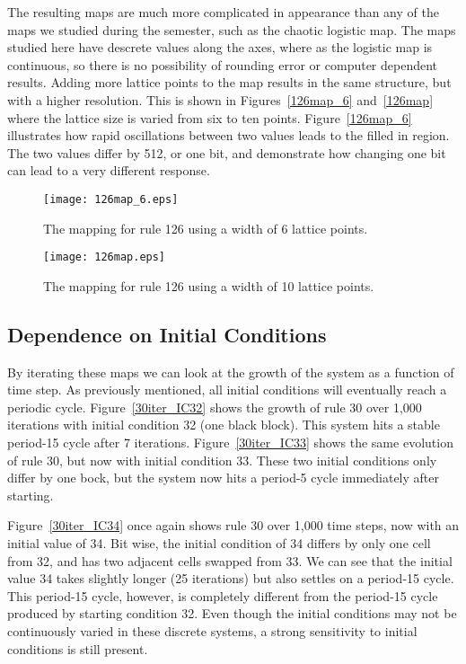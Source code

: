 The resulting maps are much more complicated in appearance than any of the maps we studied during the semester, such as the chaotic logistic map.  
The maps studied here have descrete values along the axes, where as the logistic map is continuous, so there is no possibility of rounding error or computer dependent results.  
Adding more lattice points to the map results in the same structure, but with a higher resolution.  
This is shown in Figures~\ref{126map_6} and~\ref{126map} where the lattice size is varied from six to ten points.  
Figure~\ref{126map_6} illustrates how rapid oscillations between two values leads to the filled in region.  
The two values differ by 512, or one bit, and demonstrate how changing one bit can lead to a very different response.   

\begin{figure}
    \begin{minipage}[b]{0.49\textwidth}
        \centering
        \texttt{[image: 126map\_6.eps]}
        \caption{\label{126map} The mapping for rule 126 using a width of 6 lattice points.  }
    \end{minipage}
    \hspace{0.5cm}
    \begin{minipage}[b]{0.49\textwidth}
        \centering
        \texttt{[image: 126map.eps]}
        \caption{\label{126map_dot} The mapping for rule 126 using a width of 10 lattice points.}
    \end{minipage}
\end{figure}

\subsection{Dependence on Initial Conditions}

By iterating these maps we can look at the growth of the system as a function of time step.  As previously mentioned, all initial conditions will eventually reach a periodic cycle.  Figure~\ref{30iter_IC32} shows the growth of rule 30 over 1,000 iterations with initial condition 32 (one black block).  This system hits a stable period-15 cycle after 7 iterations.  Figure~\ref{30iter_IC33} shows the same evolution of rule 30, but now with initial condition 33.  These two initial conditions only differ by one bock, but the system now hits a period-5 cycle immediately after starting.  

Figure~\ref{30iter_IC34} once again shows rule 30 over 1,000 time steps, now with an initial value of 34.  Bit wise, the initial condition of 34 differs by only one cell from 32, and has two adjacent cells swapped from 33.  We can see that the initial value 34 takes slightly longer (25 iterations) but also settles on a period-15 cycle.  This period-15 cycle, however, is completely different from the period-15 cycle produced by starting condition 32.  Even though the initial conditions may not be continuously varied in these discrete systems, a strong sensitivity to initial conditions is still present.  

